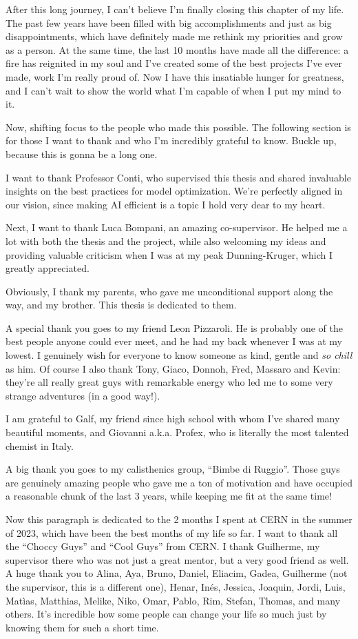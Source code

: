 \documentclass[12pt,a4paper,openright,twoside]{report}
\begin{document}
After this long journey, I can't believe I'm finally closing this chapter of my life. The past few years have been filled with big accomplishments and just as big disappointments, which have definitely made me rethink my priorities and grow as a person. At the same time, the last 10 months have made all the difference: a fire has reignited in my soul and I've created some of the best projects I've ever made, work I'm really proud of. Now I have this insatiable hunger for greatness, and I can't wait to show the world what I'm capable of when I put my mind to it.

Now, shifting focus to the people who made this possible. The following section is for those I want to thank and who I'm incredibly grateful to know. Buckle up, because this is gonna be a long one.

I want to thank Professor Conti, who supervised this thesis and shared invaluable insights on the best practices for model optimization. We're perfectly aligned in our vision, since making AI efficient is a topic I hold very dear to my heart.

Next, I want to thank Luca Bompani, an amazing co-supervisor. He helped me a lot with both the thesis and the project, while also welcoming my ideas and providing valuable criticism when I was at my peak Dunning-Kruger, which I greatly appreciated.

Obviously, I thank my parents, who gave me unconditional support along the way, and my brother. This thesis is dedicated to them.

A special thank you goes to my friend Leon Pizzaroli. He is probably one of the best people anyone could ever meet, and he had my back whenever I was at my lowest. I genuinely wish for everyone to know someone as kind, gentle and \textit{so chill} as him. Of course I also thank Tony, Giaco, Donnoh, Fred, Massaro and Kevin: they're all really great guys with remarkable energy who led me to some very strange adventures (in a good way!).

I am grateful to Galf, my friend since high school with whom I've shared many beautiful moments, and Giovanni a.k.a. Profex, who is literally the most talented chemist in Italy.

A big thank you goes to my calisthenics group, ``Bimbe di Ruggio''. Those guys are genuinely amazing people who gave me a ton of motivation and have occupied a reasonable chunk of the last 3 years, while keeping me fit at the same time!

Now this paragraph is dedicated to the 2 months I spent at CERN in the summer of 2023, which have been the best months of my life so far. I want to thank all the ``Choccy Guys'' and ``Cool Guys'' from CERN. I thank Guilherme, my supervisor there who was not just a great mentor, but a very good friend as well. A huge thank you to Alina, Aya, Bruno, Daniel, Eliacim, Gadea, Guilherme (not the supervisor, this is a different one), Henar, Inés, Jessica, Joaquin, Jordi, Luis, Matìas, Matthias, Melike, Niko, Omar, Pablo, Rim, Stefan, Thomas, and many others. It's incredible how some people can change your life so much just by knowing them for such a short time.
\end{document}
